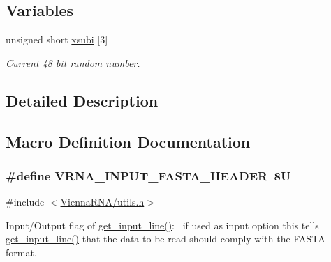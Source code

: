\subsection*{Variables}
\begin{DoxyCompactItemize}
\item 
unsigned short \hyperlink{group__utils_gaf9a866c8417afda7368bbac939ab3c47}{xsubi} \mbox{[}3\mbox{]}
\begin{DoxyCompactList}\small\item\em Current 48 bit random number. \end{DoxyCompactList}\end{DoxyCompactItemize}


\subsection{Detailed Description}


\subsection{Macro Definition Documentation}
\subsubsection[{\texorpdfstring{V\+R\+N\+A\+\_\+\+I\+N\+P\+U\+T\+\_\+\+F\+A\+S\+T\+A\+\_\+\+H\+E\+A\+D\+ER}{VRNA_INPUT_FASTA_HEADER}}]{\setlength{\rightskip}{0pt plus 5cm}\#define V\+R\+N\+A\+\_\+\+I\+N\+P\+U\+T\+\_\+\+F\+A\+S\+T\+A\+\_\+\+H\+E\+A\+D\+ER~8U}\hypertarget{group__utils_ga2f0d8069e93d3ac54d9320d6bdb8e7e7}{}\label{group__utils_ga2f0d8069e93d3ac54d9320d6bdb8e7e7}


{\ttfamily \#include $<$\hyperlink{utils_8h}{Vienna\+R\+N\+A/utils.\+h}$>$}



Input/\+Output flag of \hyperlink{group__utils_ga8ef1835eb83f542396f59f0b205965e5}{get\+\_\+input\+\_\+line()}\+:~\newline
if used as input option this tells \hyperlink{group__utils_ga8ef1835eb83f542396f59f0b205965e5}{get\+\_\+input\+\_\+line()} that the data to be read should comply with the F\+A\+S\+TA format. 

